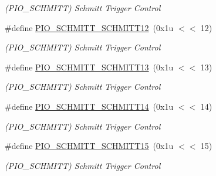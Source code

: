 \begin{DoxyCompactItemize}
\begin{DoxyCompactList}\small\item\em (P\+I\+O\+\_\+\+S\+C\+H\+M\+I\+TT) Schmitt Trigger Control \end{DoxyCompactList}\item 
\mbox{\label{group__SAME70__PIO_ga72e6308c136721a1fce4c02a21b932e6}} 
\#define \mbox{\hyperlink{group__SAME70__PIO_ga72e6308c136721a1fce4c02a21b932e6}{P\+I\+O\+\_\+\+S\+C\+H\+M\+I\+T\+T\+\_\+\+S\+C\+H\+M\+I\+T\+T12}}~(0x1u $<$$<$ 12)
\begin{DoxyCompactList}\small\item\em (P\+I\+O\+\_\+\+S\+C\+H\+M\+I\+TT) Schmitt Trigger Control \end{DoxyCompactList}\item 
\mbox{\label{group__SAME70__PIO_ga37fbc7434be639e20c71808b24d68bbd}} 
\#define \mbox{\hyperlink{group__SAME70__PIO_ga37fbc7434be639e20c71808b24d68bbd}{P\+I\+O\+\_\+\+S\+C\+H\+M\+I\+T\+T\+\_\+\+S\+C\+H\+M\+I\+T\+T13}}~(0x1u $<$$<$ 13)
\begin{DoxyCompactList}\small\item\em (P\+I\+O\+\_\+\+S\+C\+H\+M\+I\+TT) Schmitt Trigger Control \end{DoxyCompactList}\item 
\mbox{\label{group__SAME70__PIO_ga0711afb394626f9801d9a145f77af2c5}} 
\#define \mbox{\hyperlink{group__SAME70__PIO_ga0711afb394626f9801d9a145f77af2c5}{P\+I\+O\+\_\+\+S\+C\+H\+M\+I\+T\+T\+\_\+\+S\+C\+H\+M\+I\+T\+T14}}~(0x1u $<$$<$ 14)
\begin{DoxyCompactList}\small\item\em (P\+I\+O\+\_\+\+S\+C\+H\+M\+I\+TT) Schmitt Trigger Control \end{DoxyCompactList}\item 
\mbox{\label{group__SAME70__PIO_ga592235d8c45c3a4b59aa0b56a68c8252}} 
\#define \mbox{\hyperlink{group__SAME70__PIO_ga592235d8c45c3a4b59aa0b56a68c8252}{P\+I\+O\+\_\+\+S\+C\+H\+M\+I\+T\+T\+\_\+\+S\+C\+H\+M\+I\+T\+T15}}~(0x1u $<$$<$ 15)
\begin{DoxyCompactList}\small\item\em (P\+I\+O\+\_\+\+S\+C\+H\+M\+I\+TT) Schmitt Trigger Control \end{DoxyCompactList}\item 

\end{DoxyCompactItemize}
